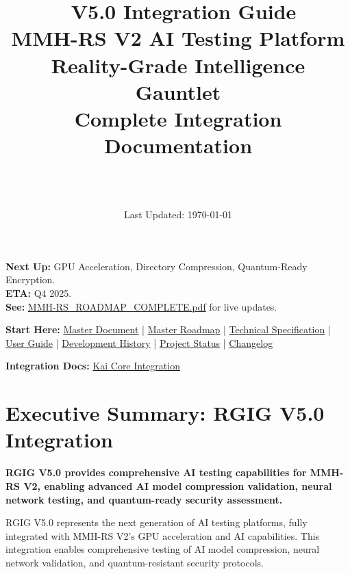 \documentclass[12pt,a4paper]{article}
\title{\Huge\textbf{\project\ V5.0 Integration Guide}\\[0.5cm]
\Large\textbf{MMH-RS V2 AI Testing Platform}\\[0.3cm]
\large Reality-Grade Intelligence Gauntlet\\[0.5cm]
\large Complete Integration Documentation}
\author{\Large\authorname\\[0.2cm]\email\\[0.2cm]\github}
\date{\large Last Updated: \today}
\begin{document}
\maketitle
\thispagestyle{empty}

\begin{tcolorbox}[colback=orange!10,colframe=orange!50,title=\textbf{V2 GPU/Quantum Features in Active Development}]
\textbf{Next Up:} GPU Acceleration, Directory Compression, Quantum-Ready Encryption.\\
\textbf{ETA:} Q4 2025.\\
\textbf{See:} \href{MMH-RS_ROADMAP_COMPLETE.pdf}{MMH-RS\_ROADMAP\_COMPLETE.pdf} for live updates.
\end{tcolorbox}

\begin{tcolorbox}[colback=blue!10,colframe=blue!50,title=\textbf{Full Documentation Suite}]
\textbf{Start Here:} \href{MMH-RS_MASTER_DOCUMENT.pdf}{Master Document} | \href{MMH-RS_ROADMAP_COMPLETE.pdf}{Master Roadmap} | \href{MMH-RS_TECHNICAL_COMPLETE.pdf}{Technical Specification} | \href{USER_GUIDE.md}{User Guide} | \href{DEVELOPMENT_HISTORY.md}{Development History} | \href{PROJECT_STATUS.md}{Project Status} | \href{CHANGELOG.md}{Changelog}

\textbf{Integration Docs:} \href{KAI_CORE_INTEGRATION_COMPLETE.pdf}{Kai Core Integration}
\end{tcolorbox}

\tableofcontents
\newpage

\section{Executive Summary: RGIG V5.0 Integration}

\begin{tcolorbox}[colback=v2blue!10,colframe=v2blue!50,title=\textbf{RGIG V5.0 Integration Summary}]
\textbf{RGIG V5.0 provides comprehensive AI testing capabilities for MMH-RS V2, enabling advanced AI model compression validation, neural network testing, and quantum-ready security assessment.}

RGIG V5.0 represents the next generation of AI testing platforms, fully integrated with MMH-RS V2's GPU acceleration and AI capabilities. This integration enables comprehensive testing of AI model compression, neural network validation, and quantum-resistant security protocols.
\end{tcolorbox}
\end{document}
